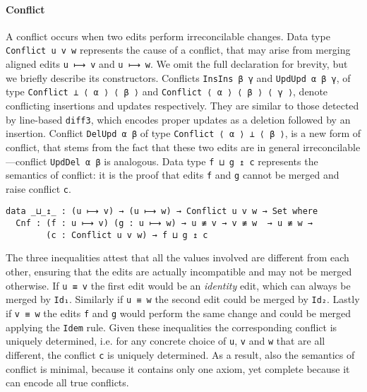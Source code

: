 \documentclass{sigplanconf}
\theoremstyle{plain}
\begin{document}
\paragraph{Conflict}
A conflict occurs when two edits perform irreconcilable changes.  
%
Data type \texttt{Conflict u v w} represents the cause of
a conflict, that may arise from merging aligned edits \texttt{u ⟼ v}
and \texttt{u ⟼ w}.
%
We omit the full declaration for brevity, but we briefly describe its
constructors.
%
Conflicts \texttt{InsIns β γ} and \texttt{UpdUpd α β γ}, of type
\texttt{Conflict ⊥ ⟨ α ⟩ ⟨ β ⟩} and \texttt{Conflict ⟨ α ⟩ ⟨ β ⟩ ⟨ γ
  ⟩}, denote conflicting insertions and updates respectively.
%
They are similar to those detected by line-based \texttt{diff3}, which
encodes proper updates as a deletion followed by an insertion.
%
Conflict \texttt{DelUpd α β} of type \texttt{Conflict ⟨ α ⟩ ⊥ ⟨ β ⟩},
is a new form of conflict, that stems from the fact that these two
edits are in general irreconcilable ---conflict \texttt{UpdDel α β} is analogous.
%
Data type \texttt{f ⊔ g ↥ c} represents the semantics of conflict: it
is the proof that edits \texttt{f} and \texttt{g} cannot be merged and
raise conflict \texttt{c}.
\begin{verbatim}
data _⊔_↥_ : (u ⟼ v) → (u ⟼ w) → Conflict u v w → Set where
  Cnf : (f : u ⟼ v) (g : u ⟼ w) → u ≢ v → v ≢ w  → u ≢ w → 
        (c : Conflict u v w) → f ⊔ g ↥ c
\end{verbatim}
The three inequalities attest that all the values involved are
different from each other, ensuring that the edits are actually
incompatible and may not be merged otherwise. 
%
If \texttt{u ≡ v} the first edit would be an \emph{identity} edit,
which can always be merged by \texttt{Id₁}. Similarly if \texttt{u ≡
  w} the second edit could be merged by \texttt{Id₂}. Lastly if
\texttt{v ≡ w} the edits \texttt{f} and \texttt{g} would perform the
same change and could be merged applying the \texttt{Idem} rule.
%
Given these inequalities the corresponding conflict is uniquely
determined, i.e. for any concrete choice of \texttt{u}, \texttt{v} and
\texttt{w} that are all different, the conflict \texttt{c} is uniquely
determined.
%
As a result, also the semantics of conflict is minimal, because it
contains only one axiom, yet complete because it can encode all true
conflicts.
\end{document}
